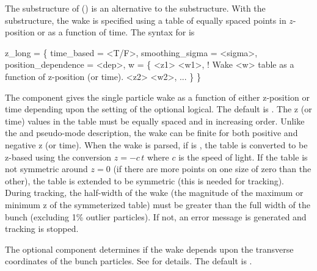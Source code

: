 The  substructure of  () is an alternative to the
 substructure. With the  substructure, the wake is specified using a
table of equally spaced points in $z$-position or as a function of time. The syntax for 
is
\begin{example}
  z_long = \{
    time_based = <T/F>,
    smoothing_sigma = <sigma>,
    position_dependence = <dep>,
    w = \{
      <z1>  <w1>,            ! Wake <w> table as a function of z-position (or time).
      <z2>  <w2>,
      ...
    \}
  \}
\end{example}
The  component gives the single particle wake as a function of either z-position or time
depending upon the setting of the optional  logical. The default is . The z
(or time) values in the  table must be equally spaced and in increasing order. Unlike the
 and  pseudo-mode description, the wake can be finite for both
positive and negative z (or time). When the wake is parsed, if  is , the
table is converted to be z-based using the conversion $z = -c \, t$ where $c$ is the speed of
light. If the table is not symmetric around $z = 0$ (if there are more points on one size of zero
than the other), the table is extended to be symmetric (this is needed for tracking).  During
tracking, the half-width of the wake (the magnitude of the maximum or minimum z of the symmeterized
table) must be greater than the full width of the bunch (excluding 1\% outlier particles). If not,
an error message is generated and tracking is stopped. 

The optional  component determines if the wake depends upon the transverse coordinates
of the bunch particles. See  for details. The default is . 

